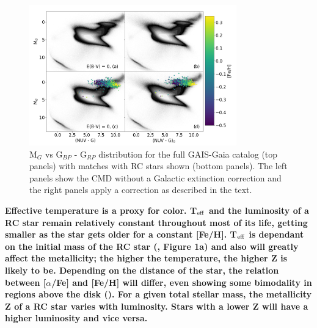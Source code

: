 \documentclass[twocolumn]{emulateapj}
\begin{document}
\begin{figure}[] %
\centering
\includegraphics[width=0.8\textwidth]{f2.pdf}
\caption{M$_G$ vs G$_{BP}$ - G$_{RP}$ distribution for the full GAIS-Gaia catalog (top panels) with matches with RC stars shown (bottom panels). The left panels show the CMD without a Galactic extinction correction and the right panels apply a correction as described in the text.}
\end{figure}


\textbf{Effective temperature is a proxy for color. T$_{\rm{eff}}$ and the luminosity of a RC star remain relatively constant throughout most of its life, getting smaller as the star gets older for a constant [Fe/H]. T$_{\rm{eff}}$ is dependant on the initial mass of the RC star (\citealt{girardi16}, Figure 1a) and also will greatly affect the metallicity; the higher the temperature, the higher Z is likely to be. Depending on the distance of the star, the relation between [$\alpha$/Fe] and [Fe/H] will differ, even showing some bimodality in regions above the disk (\citealt{hayden15}). For a given total stellar mass, the metallicity Z of a RC star varies with luminosity. Stars with a lower Z will have a higher luminosity and vice versa.}

\end{document}
